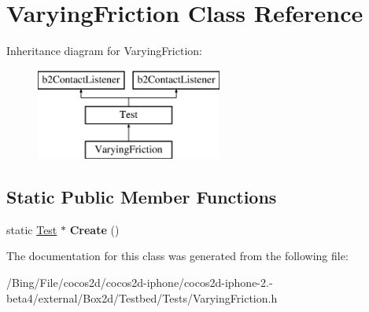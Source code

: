 \hypertarget{class_varying_friction}{\section{Varying\-Friction Class Reference}
\label{class_varying_friction}
}
Inheritance diagram for Varying\-Friction\-:\begin{figure}[H]
\begin{center}
\leavevmode
\includegraphics[height=3.000000cm]{class_varying_friction}
\end{center}
\end{figure}
\subsection*{Static Public Member Functions}
\begin{DoxyCompactItemize}
\item 
\hypertarget{class_varying_friction_a44255fb0955454ae4838a53411103c1f}{static \hyperlink{class_test}{Test} $\ast$ {\bfseries Create} ()}\label{class_varying_friction_a44255fb0955454ae4838a53411103c1f}

\end{DoxyCompactItemize}


The documentation for this class was generated from the following file\-:\begin{DoxyCompactItemize}
\item 
/\-Bing/\-File/cocos2d/cocos2d-\/iphone/cocos2d-\/iphone-\/2.-\/beta4/external/\-Box2d/\-Testbed/\-Tests/Varying\-Friction.\-h\end{DoxyCompactItemize}
